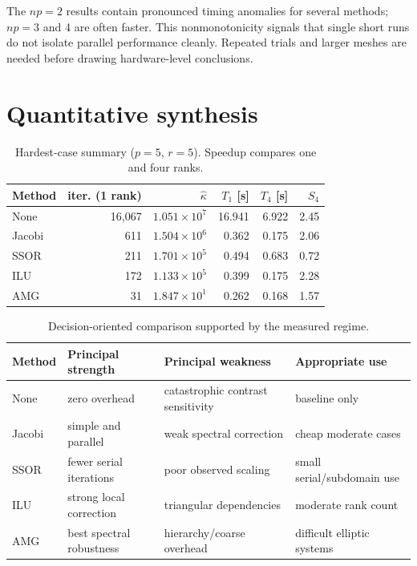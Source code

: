 \documentclass[10pt,a4paper]{article}
\begin{document}
The $np=2$ results contain pronounced timing anomalies for several methods; $np=3$ and 4 are
often faster. This nonmonotonicity signals that single short runs do not isolate parallel performance
cleanly. Repeated trials and larger meshes are needed before drawing hardware-level conclusions.

\newpage
\section{Quantitative synthesis}
\begin{table}[h]
\centering
\caption{Hardest-case summary ($p=5$, $r=5$). Speedup compares one and four ranks.}
\small
\begin{tabular}{lrrrrr}
\toprule
Method & iter. (1 rank) & $\widehat\kappa$ & $T_1$ [s] & $T_4$ [s] & $S_4$\\
\midrule
None   & 16,067 & $1.051\times10^7$ & 16.941 & 6.922 & 2.45\\
Jacobi & 611    & $1.504\times10^6$ & 0.362  & 0.175 & 2.06\\
SSOR   & 211    & $1.701\times10^5$ & 0.494  & 0.683 & 0.72\\
ILU    & 172    & $1.133\times10^5$ & 0.399  & 0.175 & 2.28\\
AMG    & 31     & $1.847\times10^1$ & 0.262  & 0.168 & 1.57\\
\bottomrule
\end{tabular}
\label{tab:synthesis}
\end{table}

\begin{table}[h]
\centering
\caption{Decision-oriented comparison supported by the measured regime.}
\begin{tabularx}{\textwidth}{lXXX}
\toprule
Method & Principal strength & Principal weakness & Appropriate use\\
\midrule
None & zero overhead & catastrophic contrast sensitivity & baseline only\\
Jacobi & simple and parallel & weak spectral correction & cheap moderate cases\\
SSOR & fewer serial iterations & poor observed scaling & small serial/subdomain use\\
ILU & strong local correction & triangular dependencies & moderate rank count\\
AMG & best spectral robustness & hierarchy/coarse overhead & difficult elliptic systems\\
\bottomrule
\end{tabularx}
\end{table}
\end{document}
